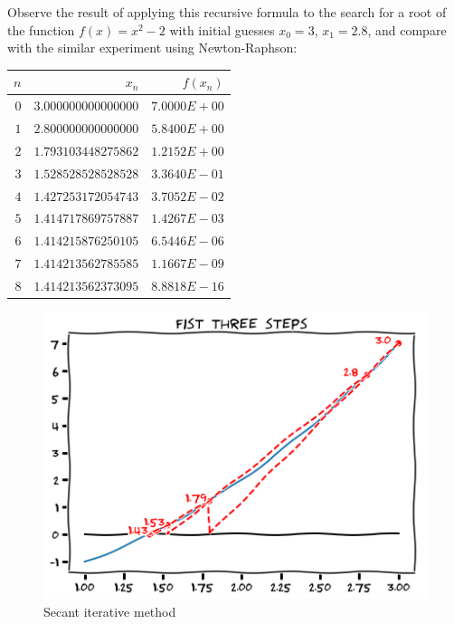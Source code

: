 \begin{example}
Observe the result of applying this recursive formula to the search for a root of the function $f(x) = x^2-2$ with initial guesses $x_0 = 3$, $x_1=2.8
$, and compare with the similar experiment using Newton-Raphson:
\begin{center}
\begin{tabular}{|r|r|r|} \hline
$n$ & $x_n$ & $f(x_n)$ \\ \hline \hline
$0$ & $3.000000000000000$ & $7.0000E+00$ \\ \hline
$1$ & $2.800000000000000$ & $5.8400E+00$ \\ \hline
$2$ & $1.793103448275862$ & $1.2152E+00$ \\ \hline
$3$ & $1.528528528528528$ & $3.3640E-01$ \\ \hline
$4$ & $1.427253172054743$ & $3.7052E-02$ \\ \hline
$5$ & $1.414717869757887$ & $1.4267E-03$ \\ \hline
$6$ & $1.414215876250105$ & $6.5446E-06$ \\ \hline
$7$ & $1.414213562785585$ & $1.1667E-09$ \\ \hline
$8$ & $1.414213562373095$ & $8.8818E-16$ \\ \hline
\end{tabular}
\end{center}
\begin{figure}[ht!]
\includegraphics[width=0.6\linewidth]{images/secant.png}
\caption{Secant iterative method}
\end{figure}
\end{example}